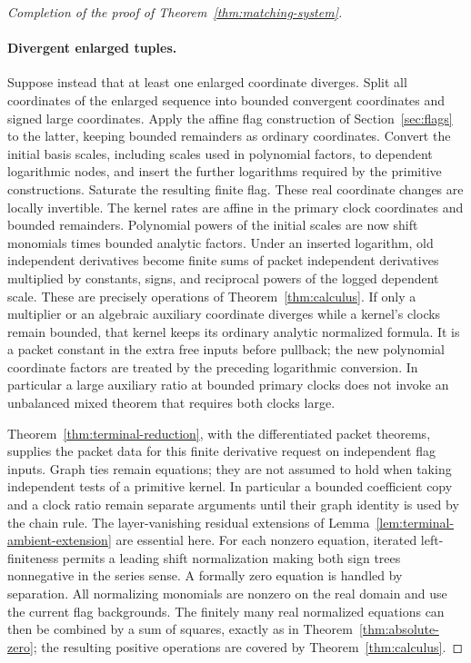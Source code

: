 \begin{proof}[Completion of the proof of Theorem~\ref{thm:matching-system}]
\paragraph{Divergent enlarged tuples.}
Suppose instead that at least one enlarged coordinate diverges.
Split all coordinates of the enlarged sequence into bounded
convergent coordinates and signed large coordinates.  Apply the
affine flag construction of Section~\ref{sec:flags} to the latter,
keeping bounded remainders as ordinary coordinates.  Convert the
initial basis scales, including scales used in polynomial factors,
to dependent logarithmic nodes, and insert the further logarithms
required by the primitive constructions.  Saturate the resulting
finite flag.  These real coordinate changes are locally invertible.
The kernel rates are affine in the primary clock coordinates and
bounded remainders.  Polynomial powers of the initial scales are
now shift monomials times bounded analytic factors.  Under an
inserted logarithm, old independent derivatives become finite sums
of packet independent derivatives multiplied by constants, signs,
and reciprocal powers of the logged dependent scale.  These are
precisely operations of Theorem~\ref{thm:calculus}.
If only a multiplier or an algebraic auxiliary coordinate diverges
while a kernel's clocks remain bounded, that kernel keeps its
ordinary analytic normalized formula.  It is a packet constant in
the extra free inputs before pullback; the new polynomial coordinate
factors are treated by the preceding logarithmic conversion.  In
particular a large auxiliary ratio at bounded primary clocks does
not invoke an unbalanced mixed theorem that requires both clocks
large.

Theorem~\ref{thm:terminal-reduction}, with the differentiated packet
theorems, supplies the packet data for this finite derivative
request on independent flag inputs.  Graph ties remain equations;
they are not assumed to hold when taking independent tests of a
primitive kernel.  In particular a bounded coefficient copy and a
clock ratio remain separate arguments until their graph identity is
used by the chain rule.  The layer-vanishing residual extensions of
Lemma~\ref{lem:terminal-ambient-extension} are essential here.
For each nonzero equation, iterated left-finiteness permits a leading
shift normalization making both sign trees nonnegative in the series
sense.  A formally zero equation is handled by separation.  All
normalizing monomials are nonzero on the real domain and use the
current flag backgrounds.  The finitely many real normalized
equations can then be combined by a sum of squares, exactly as in
Theorem~\ref{thm:absolute-zero}; the resulting positive operations
are covered by Theorem~\ref{thm:calculus}.


\end{proof}
